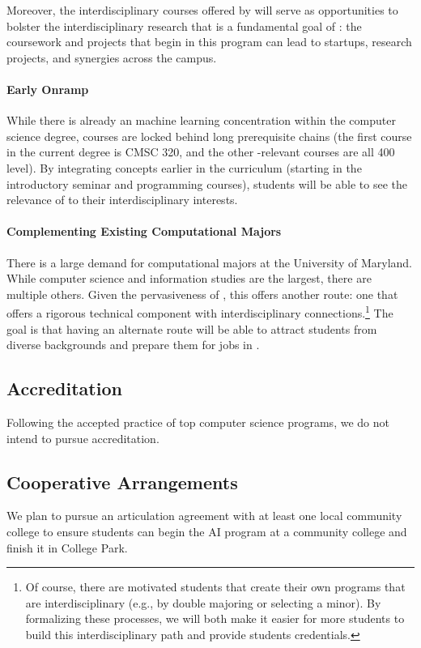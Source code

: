 Moreover, the interdisciplinary courses offered by \short{} will serve as opportunities to bolster the interdisciplinary research that is a fundamental goal of \aim{}: the coursework and projects that begin in this program can lead to startups, research projects, and synergies across the campus.

\paragraph{Early Onramp}

While there is already an machine learning  concentration within the computer science degree,  courses are locked behind long prerequisite chains (the first course in the current  degree is CMSC 320, and the other -relevant courses are all 400 level).  
%
By integrating  concepts earlier in the curriculum (starting in the introductory seminar and programming courses), students will be able to see the relevance of  to their interdisciplinary interests.

\paragraph{Complementing Existing Computational Majors}

There is a large demand for computational majors at the University of Maryland.  
%
While computer science and information studies are the largest, there are multiple others.
%
Given the pervasiveness of , this offers another route: one that offers a rigorous technical component with interdisciplinary connections.\footnote{Of course, there are motivated students that create their own programs that are interdisciplinary (e.g., by double majoring or selecting a minor).  By formalizing these processes, we will both make it easier for more students to build this interdisciplinary path and provide students credentials.}
%
The goal is that having an alternate route will be able to attract students from diverse backgrounds and prepare them for jobs in . 

\subsection{Accreditation}

Following the accepted practice of top computer science programs, we do not intend to pursue accreditation.

\subsection{Cooperative Arrangements}

We plan to pursue an articulation agreement with at least one local community college to ensure students can begin the AI program at a community college and finish it in College Park.